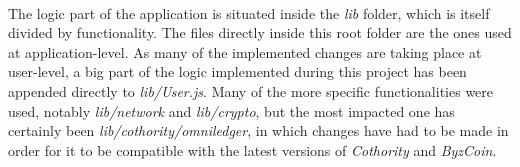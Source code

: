 \paragraph{}

The logic part of the application is situated inside the \textit{lib} folder, which is itself divided by functionality. The files directly inside this root folder are the ones used at application-level. As many of the implemented changes are taking place at user-level, a big part of the logic implemented during this project has been appended directly to \textit{lib/User.js}. Many of the more specific functionalities were used, notably \textit{lib/network} and \textit{lib/crypto}, but the most impacted one has certainly been \textit{lib/cothority/omniledger}, in which changes have had to be made in order for it to be compatible with the latest versions of \textit{Cothority} and \textit{ByzCoin}.